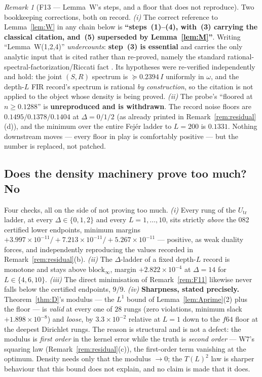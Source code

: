 \documentclass[11pt]{article}
\theoremstyle{definition}
\theoremstyle{remark}
\newtheorem{remark}{Remark}
\begin{document}
\begin{remark}[F13 --- Lemma~W's steps, and a floor that does not reproduce]
\label{rem:F13}
Two bookkeeping corrections, both on record.
\emph{(i)} The correct reference to Lemma~\ref{lem:W} in any chain below is
\textbf{``steps~(1)--(4), with~(3) carrying the classical citation,
and~(5) superseded by Lemma~\ref{lem:M}''}. Writing ``Lemma~W(1,2,4)''
\emph{undercounts}: \textbf{step~(3) is essential} and carries the only
analytic input that is cited rather than re-proved, namely the standard
rational-spectral-factorization/Riccati fact \cite{bib:am79,bib:ksh00}. Its
hypotheses were re-verified independently and hold: the joint $(S,R)$ spectrum
is $\succeq0.2394\,I$ uniformly in $\omega$, and the depth-$L$ FIR record's
spectrum is rational \emph{by construction}, so the citation is not applied to
the object whose density is being proved.
\emph{(ii)} The probe's ``floored at $n\ge0.1288$'' is
\textbf{unreproduced and is withdrawn}. The record noise floors are
$0.1495/0.1378/0.1404$ at $\Delta=0/1/2$ (as already printed in
Remark~\ref{rem:residual}(d)), and the minimum over the entire Fej\'er ladder
to $L=200$ is $0.1331$. Nothing downstream moves --- every floor in play is
comfortably positive --- but the number is replaced, not patched.
\end{remark}

\subsection{Does the density machinery prove too much? No}
Four checks, all on the side of not proving too much.
\emph{(i)} Every rung of the $U_{\mathrm{tr}}$ ladder, at every
$\Delta\in\{0,1,2\}$ and every $L=1,\dots,10$, sits strictly \emph{above} the
082 certified lower endpoints, minimum margins
$+3.997\times10^{-11}/+7.213\times10^{-11}/+5.267\times10^{-11}$ --- positive,
as weak duality forces, and independently reproducing the values recorded in
Remark~\ref{rem:residual}(b).
\emph{(ii)} The $\Delta$-ladder of a fixed depth-$L$ record is monotone and
stays above $\mathrm{block}_\infty$, margin $+2.822\times10^{-4}$ at
$\Delta=14$ for $L\in\{4,6,10\}$.
\emph{(iii)} The direct minimisation of Remark~\ref{rem:F11} likewise never
falls below the certified endpoints, $9/9$.
\emph{(iv)} \textbf{Sharpness, stated precisely.} Theorem~\ref{thm:D}'s modulus
--- the $L^1$ bound of Lemma~\ref{lem:Aprime}(2) plus the floor --- is
\emph{valid} at every one of $28$ rungs (zero violations, minimum slack
$+1.898\times10^{-8}$) and \emph{loose}, by $3.3\times10^{-2}$ relative at
$L=1$ down to the $f64$ floor at the deepest Dirichlet rungs. The reason is
structural and is not a defect: the modulus is \emph{first order} in the
kernel error while the truth is \emph{second order} --- W7's squaring law
(Remark~\ref{rem:residual}(c)), the first-order term vanishing at the
optimum. Density needs only that the modulus $\to0$; the $T(L)^2$ law is
sharper behaviour that this bound does not explain, and no claim is made that
it does.
\end{document}
